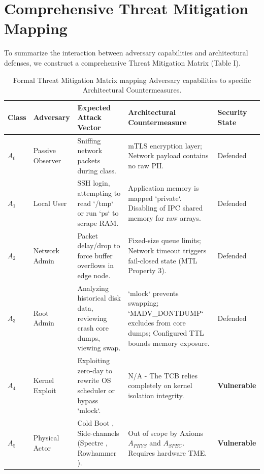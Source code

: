 \documentclass[conference]{IEEEtran}
\begin{document}
\section{Comprehensive Threat Mitigation Mapping}
To summarize the interaction between adversary capabilities and architectural defenses, we construct a comprehensive Threat Mitigation Matrix (Table I). 

\begin{table}[t]
\caption{Formal Threat Mitigation Matrix mapping Adversary capabilities to specific Architectural Countermeasures.}
\centering
\begin{tabular}{p{1.2cm} p{2.5cm} p{4.5cm} p{5.5cm} p{2.5cm}}
\toprule
\textbf{Class} & \textbf{Adversary} & \textbf{Expected Attack Vector} & \textbf{Architectural Countermeasure} & \textbf{Security State} \\
\midrule
$A_0$ & Passive Observer & Sniffing network packets during class. & mTLS encryption layer; Network payload contains no raw PII. & Defended \\
\midrule
$A_1$ & Local User & SSH login, attempting to read `/tmp` or run `ps` to scrape RAM. & Application memory is mapped `private`. Disabling of IPC shared memory for raw arrays. & Defended \\
\midrule
$A_2$ & Network Admin & Packet delay/drop to force buffer overflows in edge node. & Fixed-size queue limits; Network timeout triggers fail-closed state (MTL Property 3). & Defended \\
\midrule
$A_3$ & Root Admin & Analyzing historical disk data, reviewing crash core dumps, viewing swap. & `mlock` prevents swapping; `MADV_DONTDUMP` excludes from core dumps; Configured TTL bounds memory exposure. & Defended \\
\midrule
$A_4$ & Kernel Exploit & Exploiting zero-day to rewrite OS scheduler or bypass `mlock`. & N/A - The TCB relies completely on kernel isolation integrity. & \textbf{Vulnerable} \\
\midrule
$A_5$ & Physical Actor & Cold Boot \cite{b4}, Side-channels (Spectre \cite{b18_spectre}, Rowhammer \cite{b19_row}). & Out of scope by Axioms $A_{PHYS}$ and $A_{SPEC}$. Requires hardware TME. & \textbf{Vulnerable} \\
\bottomrule
\end{tabular}
\end{table}

\end{document}
